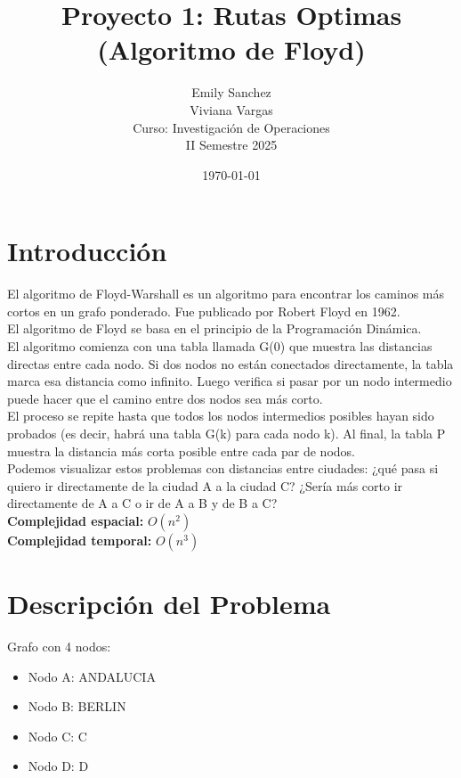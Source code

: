 \documentclass[12pt]{article}
\title{Proyecto 1: Rutas Optimas (Algoritmo de Floyd)}
\author{Emily Sanchez \\ Viviana Vargas \\[1cm] Curso: Investigación de Operaciones \\ II Semestre 2025}
\date{\today}
\begin{document}
\maketitle
\thispagestyle{empty}
\newpage
\setcounter{page}{1}

\section{Introducción}
El algoritmo de Floyd-Warshall es un algoritmo para encontrar los caminos más cortos en un grafo ponderado. Fue publicado por Robert Floyd en 1962.\\
El algoritmo de Floyd se basa en el principio de la Programación Dinámica.\\
El algoritmo comienza con una tabla llamada G(0) que muestra las distancias directas entre cada nodo. Si dos nodos no están conectados directamente, la tabla marca esa distancia como infinito. Luego verifica si pasar por un nodo intermedio puede hacer que el camino entre dos nodos sea más corto.\\
El proceso se repite hasta que todos los nodos intermedios posibles hayan sido probados (es decir, habrá una tabla G(k) para cada nodo k). Al final, la tabla P muestra la distancia más corta posible entre cada par de nodos.\\
Podemos visualizar estos problemas con distancias entre ciudades: ¿qué pasa si quiero ir directamente de la ciudad A a la ciudad C? ¿Sería más corto ir directamente de A a C o ir de A a B y de B a C?\\
\textbf{Complejidad espacial:} $O(n^2)$\\
\textbf{Complejidad temporal:} $O(n^3)$\\
\clearpage
\section{Descripción del Problema}
Grafo con 4 nodos:

\begin{itemize}
\item Nodo A: ANDALUCIA
\item Nodo B: BERLIN
\item Nodo C: C
\item Nodo D: D
\end{itemize}
\end{document}
